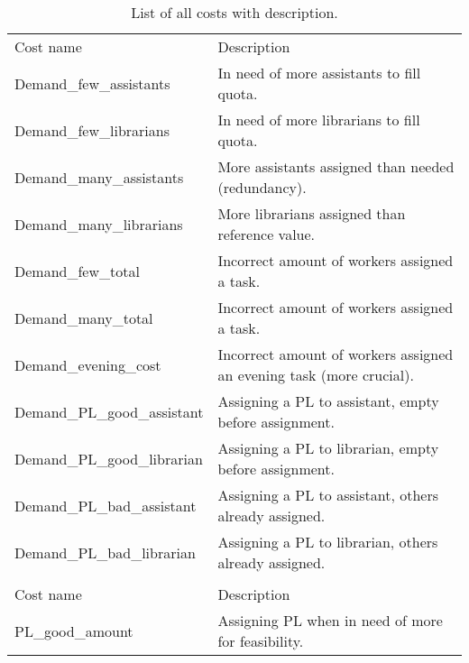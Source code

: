 \begin{table}[!h]
\centering
\caption{List of all costs with description.}
\label{tab:all_costs}
\begin{tabular}{|l|l|}
\hline
\rowcolor[HTML]{FD6864} 
\multicolumn{2}{|c|}{\cellcolor[HTML]{FD6864}Demand costs}    \\ \hline
\rowcolor[HTML]{C0C0C0} 
Cost name                                      & Description       \\ \hline
Demand\_few\_assistants                        & In need of more assistants to fill quota.                  \\ \hline
Demand\_few\_librarians                        & In need of more librarians to fill quota.                 \\ \hline
Demand\_many\_assistants                       & More assistants assigned than needed (redundancy).           \\ \hline
Demand\_many\_librarians                       & More librarians assigned than reference value.                  \\ \hline
Demand\_few\_total                             & Incorrect amount of workers assigned a task.                  \\ \hline
Demand\_many\_total                            & Incorrect amount of workers assigned a task.                  \\ \hline
Demand\_evening\_cost         & Incorrect amount of workers assigned an evening task (more crucial).\\ \hline
Demand\_PL\_good\_assistant        & Assigning a PL to assistant, empty before assignment.            \\ \hline
Demand\_PL\_good\_librarian        & Assigning a PL to librarian, empty before assignment.           \\ \hline
Demand\_PL\_bad\_assistant         & Assigning a PL to assistant, others already assigned.           \\ \hline
Demand\_PL\_bad\_librarian         & Assigning a PL to librarian, others already assigned.             \\ \hline
\rowcolor[HTML]{FD6864} 
\multicolumn{2}{|c|}{\cellcolor[HTML]{FD6864}PL amount costs} \\ \hline
\rowcolor[HTML]{C0C0C0} 
Cost name                                      & Description       \\ \hline
PL\_good\_amount                  & Assigning PL when in need of more for feasibility.                  \\ \hline

\end{tabular}
\end{table}
